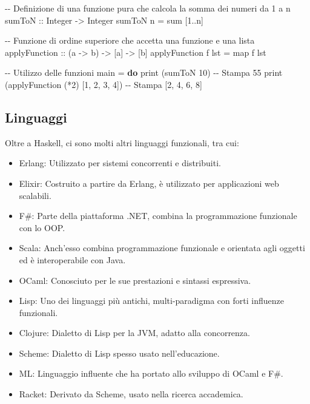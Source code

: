 \documentclass[
  letterpaper,
]{scrbook}
\newenvironment{Shaded}{\begin{snugshade}}{\end{snugshade}}
\newcommand{\CommentTok}[1]{\textcolor[rgb]{0.37,0.37,0.37}{#1}}
\newcommand{\DataTypeTok}[1]{\textcolor[rgb]{0.68,0.00,0.00}{#1}}
\newcommand{\DecValTok}[1]{\textcolor[rgb]{0.68,0.00,0.00}{#1}}
\newcommand{\FunctionTok}[1]{\textcolor[rgb]{0.28,0.35,0.67}{#1}}
\newcommand{\KeywordTok}[1]{\textcolor[rgb]{0.00,0.23,0.31}{\textbf{#1}}}
\newcommand{\NormalTok}[1]{\textcolor[rgb]{0.00,0.23,0.31}{#1}}
\newcommand{\OperatorTok}[1]{\textcolor[rgb]{0.37,0.37,0.37}{#1}}
\newcommand{\OtherTok}[1]{\textcolor[rgb]{0.00,0.23,0.31}{#1}}
\providecommand{\tightlist}{%
  \setlength{\itemsep}{0pt}\setlength{\parskip}{0pt}}\usepackage{longtable,booktabs,array}
\begin{document}
\begin{Shaded}
\begin{Highlighting}[]
\CommentTok{{-}{-} Definizione di una funzione pura che calcola la somma dei numeri da 1 a n}
\OtherTok{sumToN ::} \DataTypeTok{Integer} \OtherTok{{-}\textgreater{}} \DataTypeTok{Integer}
\NormalTok{sumToN n }\OtherTok{=} \FunctionTok{sum}\NormalTok{ [}\DecValTok{1}\OperatorTok{..}\NormalTok{n]}

\CommentTok{{-}{-} Funzione di ordine superiore che accetta una funzione e una lista}
\OtherTok{applyFunction ::}\NormalTok{ (a }\OtherTok{{-}\textgreater{}}\NormalTok{ b) }\OtherTok{{-}\textgreater{}}\NormalTok{ [a] }\OtherTok{{-}\textgreater{}}\NormalTok{ [b]}
\NormalTok{applyFunction f lst }\OtherTok{=} \FunctionTok{map}\NormalTok{ f lst}

\CommentTok{{-}{-} Utilizzo delle funzioni}
\NormalTok{main }\OtherTok{=} \KeywordTok{do}
    \FunctionTok{print}\NormalTok{ (sumToN }\DecValTok{10}\NormalTok{) }\CommentTok{{-}{-} Stampa 55}
    \FunctionTok{print}\NormalTok{ (applyFunction (}\OperatorTok{*}\DecValTok{2}\NormalTok{) [}\DecValTok{1}\NormalTok{, }\DecValTok{2}\NormalTok{, }\DecValTok{3}\NormalTok{, }\DecValTok{4}\NormalTok{]) }\CommentTok{{-}{-} Stampa [2, 4, 6, 8]}
\end{Highlighting}
\end{Shaded}

\subsection{Linguaggi}\label{linguaggi-1}

Oltre a Haskell, ci sono molti altri linguaggi funzionali, tra cui:

\begin{itemize}
\tightlist
\item
  Erlang: Utilizzato per sistemi concorrenti e distribuiti.
\item
  Elixir: Costruito a partire da Erlang, è utilizzato per applicazioni
  web scalabili.
\item
  F\#: Parte della piattaforma .NET, combina la programmazione
  funzionale con lo OOP.
\item
  Scala: Anch'esso combina programmazione funzionale e orientata agli
  oggetti ed è interoperabile con Java.
\item
  OCaml: Conosciuto per le sue prestazioni e sintassi espressiva.
\item
  Lisp: Uno dei linguaggi più antichi, multi-paradigma con forti
  influenze funzionali.
\item
  Clojure: Dialetto di Lisp per la JVM, adatto alla concorrenza.
\item
  Scheme: Dialetto di Lisp spesso usato nell'educazione.
\item
  ML: Linguaggio influente che ha portato allo sviluppo di OCaml e F\#.
\item
  Racket: Derivato da Scheme, usato nella ricerca accademica.
\end{itemize}
\end{document}
